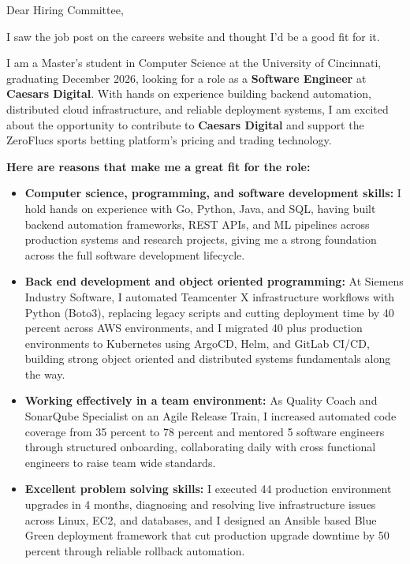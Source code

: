 \documentclass[11pt]{letter}
\date{}
\begin{document}
\begin{letter}{}

\opening{Dear Hiring Committee,}

I saw the job post on the careers website and thought I'd be a good fit for it.

I am a Master's student in Computer Science at the University of Cincinnati, graduating December 2026, looking for a role as a \textbf{Software Engineer} at \textbf{Caesars Digital}. With hands on experience building backend automation, distributed cloud infrastructure, and reliable deployment systems, I am excited about the opportunity to contribute to \textbf{Caesars Digital} and support the ZeroFlucs sports betting platform's pricing and trading technology.

\textbf{Here are reasons that make me a great fit for the role:}

\begin{itemize}[leftmargin=*, itemsep=0.45em]
    \item \textbf{Computer science, programming, and software development skills:} I hold hands on experience with Go, Python, Java, and SQL, having built backend automation frameworks, REST APIs, and ML pipelines across production systems and research projects, giving me a strong foundation across the full software development lifecycle.

    \item \textbf{Back end development and object oriented programming:} At Siemens Industry Software, I automated Teamcenter X infrastructure workflows with Python (Boto3), replacing legacy scripts and cutting deployment time by 40 percent across AWS environments, and I migrated 40 plus production environments to Kubernetes using ArgoCD, Helm, and GitLab CI/CD, building strong object oriented and distributed systems fundamentals along the way.

    \item \textbf{Working effectively in a team environment:} As Quality Coach and SonarQube Specialist on an Agile Release Train, I increased automated code coverage from 35 percent to 78 percent and mentored 5 software engineers through structured onboarding, collaborating daily with cross functional engineers to raise team wide standards.

    \item \textbf{Excellent problem solving skills:} I executed 44 production environment upgrades in 4 months, diagnosing and resolving live infrastructure issues across Linux, EC2, and databases, and I designed an Ansible based Blue Green deployment framework that cut production upgrade downtime by 50 percent through reliable rollback automation.


\end{itemize}
\end{letter}
\end{document}
